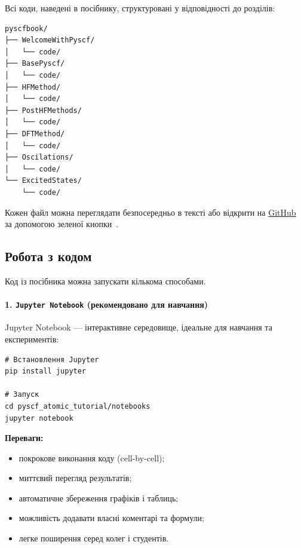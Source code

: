 
Всі коди, наведені в посібнику, структуровані у відповідності до розділів:

\begin{verbatim}
pyscfbook/
├── WelcomeWithPyscf/
│   └── code/
├── BasePyscf/
│   └── code/
├── HFMethod/
│   └── code/
├── PostHFMethods/
│   └── code/
├── DFTMethod/
│   └── code/
├── Oscilations/
│   └── code/
└── ExcitedStates/
    └── code/
\end{verbatim}

Кожен файл можна переглядати безпосередньо в тексті або відкрити на \href{\rootURI}{GitHub} за допомогою зеленої кнопки~.

\subsection*{Робота з кодом}

Код із посібника можна запускати кількома способами.

\paragraph{1. \texttt{Jupyter Notebook} (рекомендовано для навчання)}

Jupyter Notebook --- інтерактивне середовище, ідеальне для навчання та експериментів:

\begin{verbatim}
# Встановлення Jupyter
pip install jupyter

# Запуск
cd pyscf_atomic_tutorial/notebooks
jupyter notebook
\end{verbatim}

\textbf{Переваги:}
\begin{itemize}
    \item покрокове виконання коду (cell-by-cell);
    \item миттєвий перегляд результатів;
    \item автоматичне збереження графіків і таблиць;
    \item можливість додавати власні коментарі та формули;
    \item легке поширення серед колег і студентів.
\end{itemize}

